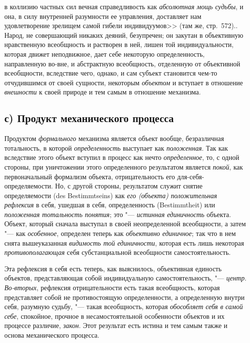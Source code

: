 {{{в коллизию частных сил вечная справедливость как {\em абсолютная мощь
судьбы}, и она, в силу внутренней разумности ее управления, доставляет нам
удовлетворение зрелищем самой гибели индивидуумов>> (там же, стр.~572).\label{bkm:bm71}}.
Народ, не совершающий никаких деяний, безупречен; он закутан
в объективную нравственную всеобщность и растворен в ней, лишен той
индивидуальности, которая движет неподвижное, дает себе некоторую
определенность, направленную во-вне, и абстрактную всеобщность, отделенную
от объективной всеобщности, вследствие чего, однако, и сам субъект
становится чем-то отчудившимся от своей сущности, некоторым
{\em объектом} и вступает
в отношение {\em внешности}
к своей природе и тем самым в отношение механизма.

\subsection[с) Продукт механического процесса]{с) Продукт механического процесса}
Продуктом
{\em формального}
механизма является объект вообще, безразличная тотальность, в
которой {\em определенность}
выступает как
{\em положенная}. Так как
вследствие этого объект вступил в процесс как нечто
{\em определенное}, то, с
одной стороны, при уничтожении этого определенного результатом является
{\em покой}, как
первоначальный формализм объекта, отрицательность его
для-себя-определяемости. Но, с другой стороны,
результатом служит
снятие
определяемости (des Bestimmtseins) как
{\em его (объекта) положительная
рефлексия} в себя, ушедшая в себя, определенность
(Bestimmtheit) или {\em положенная
тотальность понятия}; это
"--- {\em истинная единичность
}объекта. Объект, который сначала выступал в
своей неопределенной всеобщности, а затем "--- как
{\em особенное},
определен теперь как
{\em объективно единичное};
так что в нем снята вышеуказанная
{\em видимость той единичности},
которая есть лишь некоторая
{\em противополагающая}
себя субстанциальной всеобщности самостоятельность.

Эта рефлексия в себя есть теперь, как выяснилось, объективная
единость объектов, представляющая собой индивидуальную самостоятельность,
"--- {\em центр}.
{\em Во-вторых},
рефлексия отрицательности есть такая всеобщность, которая
представляет собой не противостоящую определенности, а определенную внутри
себя, разумную судьбу, "--- такая всеобщность, которая
{\em обособляет себя в
}{\em самой себе},
спокойное, прочное в несамостоятельной особенности объектов и
их процессе различие, {\em закон}.
Этот результат есть истина и тем самым также и основа
механического процесса.

}}
